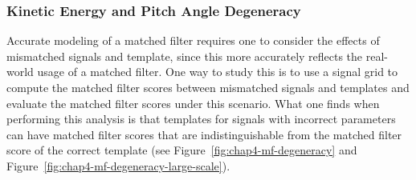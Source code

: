\subsubsection*{Kinetic Energy and Pitch Angle Degeneracy}

Accurate modeling of a matched filter requires one to consider the effects of mismatched signals and template, since this more accurately reflects the real-world usage of a matched filter. One way to study this is to use a signal grid to compute the matched filter scores between mismatched signals and templates and evaluate the matched filter scores under this scenario. What one finds when performing this analysis is that templates for signals with incorrect parameters can have matched filter scores that are indistinguishable from the matched filter score of the correct template (see Figure~\ref{fig:chap4-mf-degeneracy} and Figure~\ref{fig:chap4-mf-degeneracy-large-scale}).
